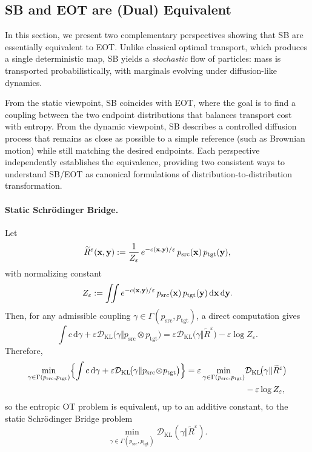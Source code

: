\subsection{SB and EOT are (Dual) Equivalent}\label{subsec:sb-eot}
In this section, we present two complementary perspectives showing that SB are essentially equivalent to EOT.  
Unlike classical optimal transport, which produces a single deterministic map, SB yields a \emph{stochastic} flow of particles: mass is transported probabilistically, with marginals evolving under diffusion-like dynamics.

From the static viewpoint, SB coincides with EOT, where the goal is to find a coupling between the two endpoint distributions that balances transport cost with entropy.  
From the dynamic viewpoint, SB describes a controlled diffusion process that remains as close as possible to a simple reference (such as Brownian motion) while still matching the desired endpoints.   Each perspective independently establishes the equivalence, providing two consistent ways to understand SB/EOT as canonical formulations of distribution-to-distribution transformation.



\paragraph{Static Schr\"odinger Bridge.}
Let
\[
  \widetilde R^\varepsilon({\mathbf{x}},{\mathbf{y}})
  := \frac{1}{Z_\varepsilon}\,e^{-c({\mathbf{x}},{\mathbf{y}})/\varepsilon}\,p_{\mathrm{src}}({\mathbf{x}})\,p_{\mathrm{tgt}}({\mathbf{y}}),
\]
with normalizing constant
\[
Z_\varepsilon := \iint e^{-c({\mathbf{x}}, {\mathbf{y}})/\varepsilon}\, p_{\mathrm{src}}({\mathbf{x}})\, p_{\mathrm{tgt}}({\mathbf{y}})\,\mathrm d{\mathbf{x}}\,\mathrm d{\mathbf{y}}.
\]
Then, for any admissible coupling \(\gamma\in\Gamma(p_{\mathrm{src}},p_{\mathrm{tgt}})\), a direct computation gives
\[
\int c\, \mathrm d\gamma
+\varepsilon \mathcal{D}_\mathrm{KL}\!\bigl(\gamma \Vert p_{\mathrm{src}}\!\otimes\!p_{\mathrm{tgt}}\bigr)
=
\varepsilon \mathcal{D}_\mathrm{KL}\!\bigl(\gamma \Vert \widetilde R^\varepsilon\bigr)
-\varepsilon\log Z_\varepsilon.
\]
Therefore,
\begin{align}
\begin{aligned}\label{eq:eot-sb-static}
    \min_{\gamma\in\Gamma(p_{\mathrm{src}},p_{\mathrm{tgt}})}
  \Bigl\{\int c \,\mathrm d\gamma
  + \varepsilon \mathcal{D}_\mathrm{KL}\!\bigl(\gamma \Vert p_{\mathrm{src}}\!\otimes\!p_{\mathrm{tgt}}\bigr)\Bigr\}
  = \varepsilon \min_{\gamma\in\Gamma(p_{\mathrm{src}},p_{\mathrm{tgt}})}
  &\mathcal{D}_\mathrm{KL}\!\bigl(\gamma \Vert \widetilde R^\varepsilon\bigr)
  \\&-\varepsilon\log Z_\varepsilon,
\end{aligned}
\end{align}
so the entropic OT problem is equivalent, up to an additive constant, to the static Schr\"odinger Bridge problem
\[
\min_{\gamma\in\Gamma(p_{\mathrm{src}},p_{\mathrm{tgt}})}
\mathcal{D}_\mathrm{KL}(\gamma\Vert \widetilde R^\varepsilon).
\]

